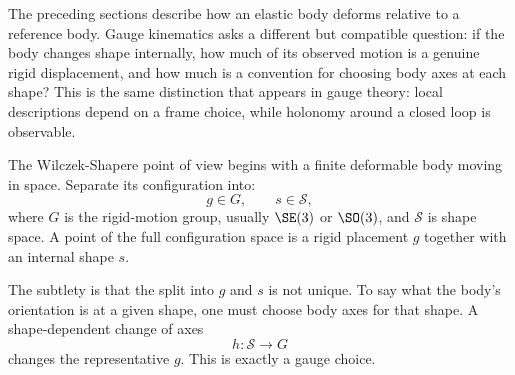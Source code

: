 The preceding sections describe how an elastic body deforms relative to a
reference body. Gauge kinematics asks a different but compatible question: if
the body changes shape internally, how much of its observed motion is a genuine
rigid displacement, and how much is a convention for choosing body axes at each
shape? This is the same distinction that appears in gauge theory: local
descriptions depend on a frame choice, while holonomy around a closed loop is
observable.

The Wilczek-Shapere point of view begins with a finite deformable body moving in
space. Separate its configuration into:
\[
  g\in G,\qquad s\in\mathcal S,
\]
where \(G\) is the rigid-motion group, usually \(\SE(3)\) or \(\SO(3)\), and
\(\mathcal S\) is shape space. A point of the full configuration space is a
rigid placement \(g\) together with an internal shape \(s\).

The subtlety is that the split into \(g\) and \(s\) is not unique. To say what
the body's orientation is at a given shape, one must choose body axes for that
shape. A shape-dependent change of axes
\[
  h:\mathcal S\to G
\]
changes the representative \(g\). This is exactly a gauge choice.

